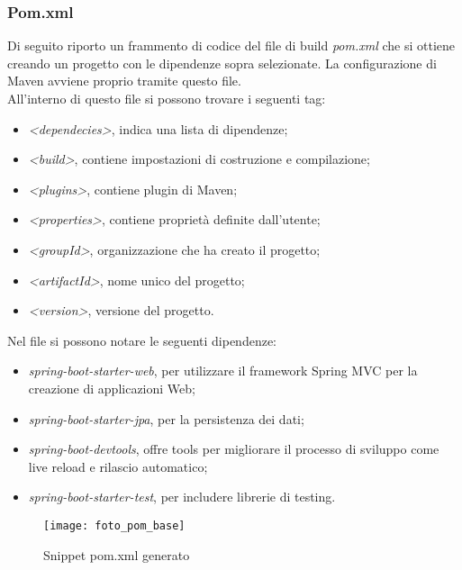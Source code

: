 \subsubsection{Pom.xml}
Di seguito riporto un frammento di codice del file di build \textit{pom.xml} che si ottiene creando un progetto con le dipendenze sopra selezionate. La configurazione di Maven avviene proprio tramite questo file.\\
All'interno di questo file si possono trovare i seguenti tag:
\begin{itemize}
\item \textit{<dependecies>}, indica una lista di dipendenze;
\item \textit{<build>}, contiene impostazioni di costruzione e compilazione;
\item \textit{<plugins>}, contiene plugin di Maven;
\item \textit{<properties>}, contiene proprietà definite dall'utente;
\item \textit{<groupId>}, organizzazione che ha creato il progetto;
\item \textit{<artifactId>}, nome unico del progetto;
\item \textit{<version>},  versione del progetto.
\end{itemize}

\noindent Nel file si possono notare le seguenti dipendenze:
\begin{itemize}
\item \textit{spring-boot-starter-web}, per utilizzare il framework Spring MVC per la creazione di applicazioni Web;
\item \textit{spring-boot-starter-jpa}, per la persistenza dei dati;
\item \textit{spring-boot-devtools}, offre tools per migliorare il processo di sviluppo come live reload e rilascio automatico;
\item \textit{spring-boot-starter-test}, per includere librerie di testing.
\end{itemize}

\begin{figure}[H] 
    \centering 
    \texttt{[image: foto\_pom\_base]} 
    \caption{Snippet pom.xml generato}
\end{figure}

